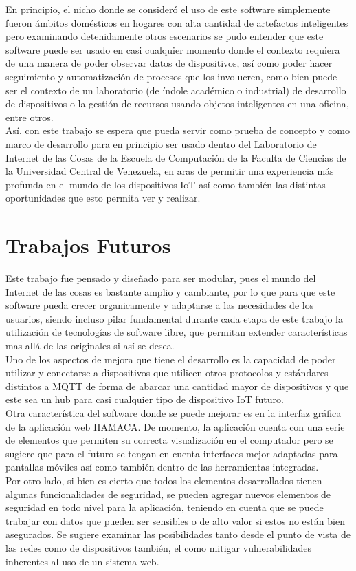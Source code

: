 En principio, el nicho donde se consideró el uso de este software simplemente fueron ámbitos domésticos en hogares con alta cantidad de artefactos inteligentes pero examinando detenidamente otros escenarios se pudo entender que este software puede ser usado en casi cualquier momento donde el contexto requiera de una manera de poder observar datos de dispositivos, así como poder hacer seguimiento y automatización de procesos que los involucren, como bien puede ser el contexto de un laboratorio (de índole académico o industrial) de desarrollo de dispositivos o la gestión de recursos usando objetos inteligentes en una oficina, entre otros.\\
 
Así, con este trabajo se espera que pueda servir como prueba de concepto y como marco de desarrollo para en principio ser usado dentro del Laboratorio de Internet de las Cosas de la Escuela de Computación de la Faculta de Ciencias de la Universidad Central de Venezuela, en aras de permitir una experiencia más profunda en el mundo de los dispositivos IoT así como también las distintas oportunidades que esto permita ver y realizar. 

\section{Trabajos Futuros}
Este trabajo fue pensado y diseñado para ser modular, pues el mundo del Internet de las cosas es bastante amplio y cambiante, por lo que para que este software pueda crecer organicamente y adaptarse a las necesidades de los usuarios, siendo incluso pilar fundamental durante cada etapa de este trabajo la utilización de tecnologías de software libre, que permitan extender características mas allá de las originales si así se desea.\\

Uno de los aspectos de mejora que tiene el desarrollo es la capacidad de poder utilizar y conectarse a dispositivos que utilicen otros protocolos y estándares distintos a MQTT de forma de abarcar una cantidad mayor de dispositivos y que este sea un hub para casi cualquier tipo de dispositivo IoT futuro.\\

Otra característica del software donde se puede mejorar es en la interfaz gráfica de la aplicación web HAMACA. De momento, la aplicación cuenta con una serie de elementos que permiten su correcta visualización en el computador pero se sugiere que para el futuro se tengan en cuenta interfaces mejor adaptadas para pantallas móviles así como también dentro de las herramientas integradas.\\

Por otro lado, si bien es cierto que todos los elementos desarrollados tienen algunas funcionalidades de seguridad, se pueden agregar nuevos elementos de seguridad en todo nivel para la aplicación, teniendo en cuenta que se puede trabajar con datos que pueden ser sensibles o de alto valor si estos no están bien asegurados. Se sugiere examinar las posibilidades tanto desde el punto de vista de las redes como de dispositivos también, el como mitigar vulnerabilidades inherentes al uso de un sistema web. 